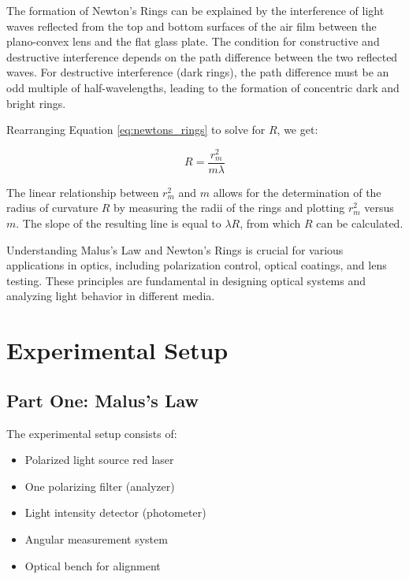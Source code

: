 \documentclass[journal]{IEEEtran}
\begin{document}
The formation of Newton's Rings can be explained by the interference of light waves reflected from the top and bottom surfaces of the air film between the plano-convex lens and the flat glass plate. The condition for constructive and destructive interference depends on the path difference between the two reflected waves. For destructive interference (dark rings), the path difference must be an odd multiple of half-wavelengths, leading to the formation of concentric dark and bright rings.

Rearranging Equation \ref{eq:newtons_rings} to solve for $R$, we get:

\begin{equation}
    R = \frac{r_m^2}{m \lambda}
    \label{eq:radius_of_curvature}
\end{equation}

The linear relationship between $r_m^2$ and $m$ allows for the determination of the radius of curvature $R$ by measuring the radii of the rings and plotting $r_m^2$ versus $m$. The slope of the resulting line is equal to $\lambda R$, from which $R$ can be calculated.

Understanding Malus's Law and Newton's Rings is crucial for various applications in optics, including polarization control, optical coatings, and lens testing. These principles are fundamental in designing optical systems and analyzing light behavior in different media.

\section{Experimental Setup}

\subsection{Part One: Malus's Law}
The experimental setup consists of:
\begin{itemize}
    \item Polarized light source red laser
    \item One polarizing filter (analyzer)
    \item Light intensity detector (photometer)
    \item Angular measurement system
    \item Optical bench for alignment
\end{itemize}
\end{document}
